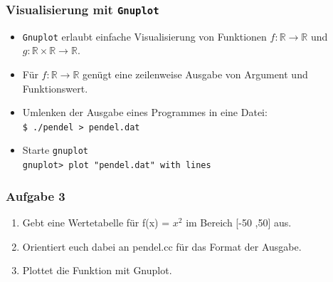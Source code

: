 \documentclass[ignorenonframetext,12pt]{beamer}
\theoremstyle{definition}
\theoremstyle{definition}
\begin{document}
\begin{frame}
\frametitle{Visualisierung mit \lstinline{Gnuplot}}
\begin{itemize}
\item \lstinline{Gnuplot} erlaubt einfache Visualisierung von Funktionen
  $f:\mathbb{R}\to\mathbb{R}$ und
  $g:\mathbb{R}\times\mathbb{R}\to\mathbb{R}$.
\item Für  $f:\mathbb{R}\to\mathbb{R}$ genügt eine zeilenweise Ausgabe
  von Argument und Funktionswert.
\item Umlenken der Ausgabe eines Programmes in eine Datei:\\
\lstinline{$ ./pendel > pendel.dat}
\item Starte \lstinline{gnuplot}\\
\lstinline{gnuplot> plot "pendel.dat" with lines}
\end{itemize}
\end{frame}


\begin{frame}[fragile]
\frametitle{Aufgabe 3}
\begin{enumerate}
\item Gebt eine Wertetabelle für  f(x) = $x^2$ im Bereich [-50 ,50] aus.
\item Orientiert euch dabei an pendel.cc für das Format der Ausgabe.
\item Plottet die Funktion mit Gnuplot. 
\end{enumerate}
\end{frame}
\end{document}
